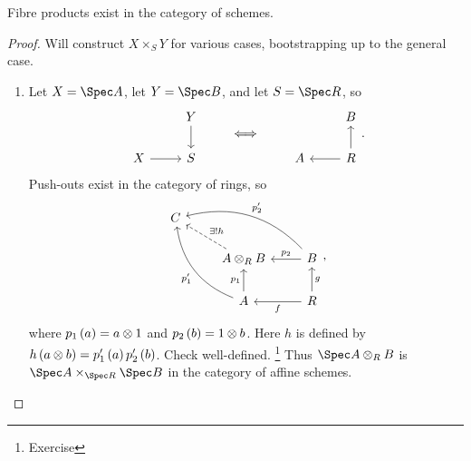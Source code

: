 
\begin{theorem}
Fibre products exist in the category of schemes.
\end{theorem}

\begin{proof}
Will construct $ X \times_S Y $ for various cases, bootstrapping up to the general case.
\begin{enumerate}[leftmargin=0.5in, label=Step \arabic*.]
\item Let $ X = \Spec A $, let $ Y = \Spec B $, and let $ S = \Spec R $, so
$$
\begin{tikzcd}
& Y \arrow{d} \\
X \arrow{r} & S
\end{tikzcd}
\qquad \iff \qquad
\begin{tikzcd}
& B \\
A & R \arrow{u} \arrow{l}
\end{tikzcd}.
$$
Push-outs exist in the category of rings, so
$$
\begin{tikzcd}
C & & \\
& A \otimes_R B \arrow[dashed]{ul}[swap]{\exists !h} & B \arrow[bend right=30]{ull}[swap]{p_2'} \arrow{l}[swap]{p_2} \\
& A \arrow[bend left=30]{uul}{p_1'} \arrow{u}{p_1} & R \arrow{u}[swap]{g} \arrow{l}{f}
\end{tikzcd},
$$
where $ p_1\br{a} = a \otimes 1 $ and $ p_2\br{b} = 1 \otimes b $. Here $ h $ is defined by $ h\br{a \otimes b} = p_1'\br{a}p_2'\br{b} $. Check well-defined. \footnote{Exercise} Thus $ \Spec A \otimes_R B $ is $ \Spec A \times_{\Spec R} \Spec B $ in the category of affine schemes.

\pagebreak


\end{enumerate}
\end{proof}

